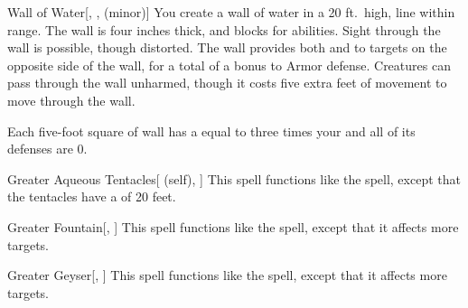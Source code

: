 \lowercase{\hypertarget{spell:Wall of Water}{}}\label{spell:Wall of Water}
\begin{freeability}[\nth{3}]{\hypertarget{spell:Wall of Water}{Wall of Water}}[, ,  (minor)]
\targetrule
You create a wall of water in a 20 ft.\ high, \arealarge line within \rngmed range.
The wall is four inches thick, and blocks  for abilities.
Sight through the wall is possible, though distorted.
The wall provides both  and  to targets on the opposite side of the wall, for a total of a  bonus to Armor defense.
Creatures can pass through the wall unharmed, though it costs five extra feet of movement to move through the wall.

Each five-foot square of wall has a  equal to three times your  and all of its defenses are 0.
\end{freeability}
\vspace{0.25em}



\lowercase{\hypertarget{spell:Greater Aqueous Tentacles}{}}\label{spell:Greater Aqueous Tentacles}
\begin{attuneability}[\nth{4}]{\hypertarget{spell:Greater Aqueous Tentacles}{Greater Aqueous Tentacles}}[ (self), ]
This spell functions like the  spell, except that the tentacles have a  of 20 feet.
\end{attuneability}
\vspace{0.25em}



\lowercase{\hypertarget{spell:Greater Fountain}{}}\label{spell:Greater Fountain}
\begin{freeability}[\nth{4}]{\hypertarget{spell:Greater Fountain}{Greater Fountain}}[, ]
This spell functions like the  spell, except that it affects more targets.
\end{freeability}
\vspace{0.25em}



\lowercase{\hypertarget{spell:Greater Geyser}{}}\label{spell:Greater Geyser}
\begin{freeability}[\nth{4}]{\hypertarget{spell:Greater Geyser}{Greater Geyser}}[, ]
This spell functions like the  spell, except that it affects more targets.
\end{freeability}
\vspace{0.25em}



